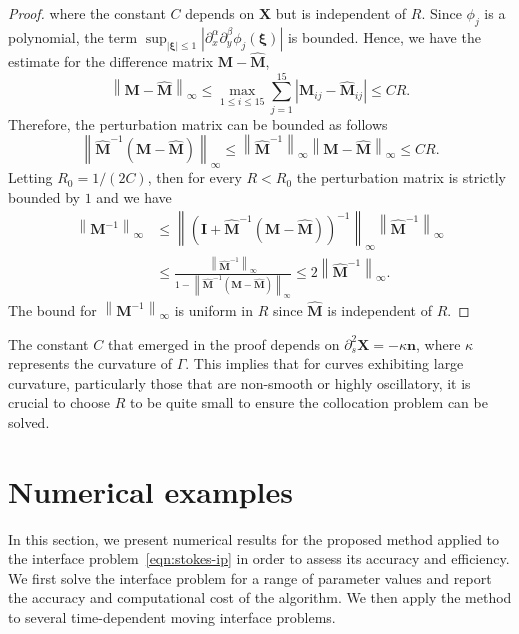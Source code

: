 \documentclass[preprint,11pt]{elsarticle}
\theoremstyle{remark}
\newcommand{\wh}[1]{\widehat{#1}}
\newcommand{\bm}[1]{\boldsymbol{#1}}
\newcommand{\norm}[1]{\left\lVert #1 \right\rVert}
\begin{document}
\begin{proof}
where the constant $C$ depends on $\bm X$ but is independent of $R$.
Since $\phi_j$ is a polynomial, the term $\sup_{|\bm \xi|\leq 1}|\partial_x^\alpha\partial_y^\beta \phi_j(\bm \xi)|$ is bounded.
Hence, we have the estimate for the difference matrix $\bm M - \wh{\bm M}$,
\begin{equation}
    \norm{\bm M - \wh{\bm M}}_{\infty} \leq \max_{1\leq i\leq 15}\sum_{j=1}^{15} |\bm M_{ij} - \wh{\bm M}_{ij}| \leq C R .
\end{equation}
Therefore, the perturbation matrix can be bounded as follows
\begin{equation}
    \norm{\wh{\bm M}^{-1}(\bm M - \wh{\bm M})}_\infty \leq \norm{\wh{\bm M}^{-1}}_\infty\norm{\bm M - \wh{\bm M}}_\infty \leq C R.
\end{equation}
Letting $R_0 = 1/(2C)$, then for every $R<R_0$ the perturbation matrix is strictly bounded by $1$ and we have 
\begin{equation}
\begin{aligned}
    \norm{\bm M^{-1}}_\infty & \leq \norm{(\bm I + \wh{\bm M}^{-1}(\bm M-\wh{\bm M}))^{-1}}_\infty \norm{\wh{\bm M}^{-1}}_\infty 
    \\& \leq \frac{\norm{\wh{\bm M}^{-1}}_\infty}{1 - \norm{\wh{\bm M}^{-1}(\bm M - \wh{\bm M})}_\infty} \leq 2 \norm{\wh{\bm M}^{-1}}_\infty.
\end{aligned}
\end{equation}
The bound for $\norm{\bm M^{-1}}_\infty$ is uniform in $R$ since $\wh{\bm M}$ is independent of $R$.
\end{proof}

The constant $C$ that emerged in the proof depends on $\partial_s^2\bm X = -\kappa\bm n$, where $\kappa$ represents the curvature of $\Gamma$. This implies that for curves exhibiting large curvature, particularly those that are non-smooth or highly oscillatory, it is crucial to choose $R$ to be quite small to ensure the collocation problem can be solved.


\section{Numerical examples}\label{sec6}
In this section, we present numerical results for the proposed method applied to the interface problem~\eqref{eqn:stokes-ip} in order to assess its accuracy and efficiency. 
We first solve the interface problem for a range of parameter values and report the accuracy and computational cost of the algorithm. 
We then apply the method to several time-dependent moving interface problems.
\end{document}
